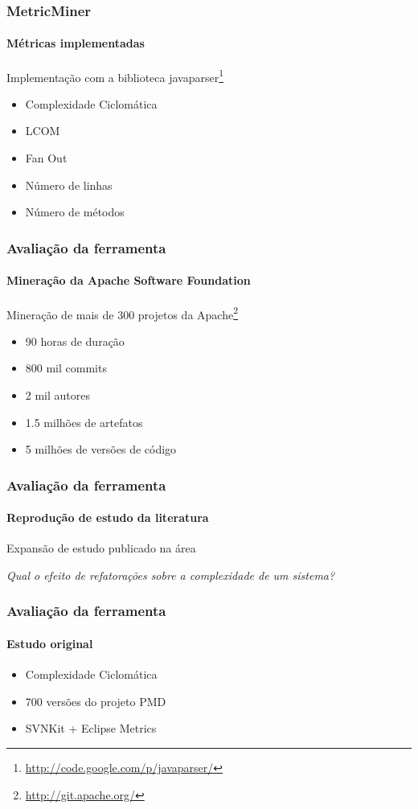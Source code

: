 \documentclass[brazil]{beamer}
\begin{document}
	\begin{frame}
		\frametitle{MetricMiner}
		\framesubtitle{Métricas implementadas}

		Implementação com a biblioteca javaparser\footnote{\url{http://code.google.com/p/javaparser/}}

		\begin{itemize}
			\item Complexidade Ciclomática
			\item LCOM
			\item Fan Out
			\item Número de linhas
			\item Número de métodos
		\end{itemize}
	\end{frame}

	\begin{frame}
		\frametitle{Avaliação da ferramenta}
		\framesubtitle{Mineração da Apache Software Foundation}

		Mineração de mais de 300 projetos da Apache\footnote{\url{http://git.apache.org/}}

		\begin{itemize}
			\item 90 horas de duração
			\item 800 mil commits
			\item 2 mil autores
			\item 1.5 milhões de artefatos
			\item 5 milhões de versões de código
		\end{itemize}
	\end{frame}

	\begin{frame}
		\frametitle{Avaliação da ferramenta}
		\framesubtitle{Reprodução de estudo da literatura}

		Expansão de estudo publicado na área \cite{SoetensQUATIC2010}

		\vspace{0.5cm}

		\emph{Qual o efeito de refatorações sobre a complexidade de um sistema?}

	\end{frame}


	\begin{frame}
		\frametitle{Avaliação da ferramenta}
		\framesubtitle{Estudo original}

		\begin{itemize}
			\item Complexidade Ciclomática
			\item 700 versões do projeto PMD
			\item SVNKit + Eclipse Metrics
		\end{itemize}

	\end{frame}
\end{document}
